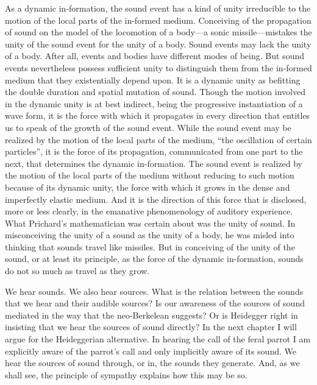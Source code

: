 As a dynamic in-formation, the sound event has a kind of unity irreducible to the motion of the local parts of the in-formed medium. Conceiving of the propagation of sound on the model of the locomotion of a body---a sonic missile---mistakes the unity of the sound event for the unity of a body. Sound events may lack the unity of a body. After all, events and bodies have different modes of being. But sound events nevertheless possess sufficient unity to distinguish them from the in-formed medium that they existentially depend upon. It is a dynamic unity as befitting the double duration and spatial mutation of sound. Though the motion involved in the dynamic unity is at best indirect, being the progressive instantiation of a wave form, it is the force with which it propagates in every direction that entitles us to speak of the growth of the sound event.  While the sound event may be realized by the motion of the local parts of the medium, ``the oscillation of certain particles'', it is the force of its propagation, communicated from one part to the next, that determines the dynamic in-formation. The sound event is realized by the motion of the local parts of the medium without reducing to such motion because of its dynamic unity, the force with which it grows in the dense and imperfectly elastic medium. And it is the direction of this force that is disclosed, more or less clearly, in the emanative phenomenology of auditory experience. What Prichard's mathematician was certain about was the unity of sound. In misconceiving the unity of a sound as the unity of a body, he was misled into thinking that sounds travel like missiles. But in conceiving of the unity of the sound, or at least its principle, as the force of the dynamic in-formation, sounds do not so much as travel as they grow.


We hear sounds. We also hear sources. What is the relation between the sounds that we hear and their audible sources? Is our awareness of the sources of sound mediated in the way that the neo-Berkelean suggests? Or is Heidegger right in insisting that we hear the sources of sound directly? In the next chapter I will argue for the Heideggerian alternative. In hearing the call of the feral parrot I am explicitly aware of the parrot's call and only implicitly aware of its sound. We hear the sources of sound through, or in, the sounds they generate. And, as we shall see, the principle of sympathy explains how this may be so.

% 




